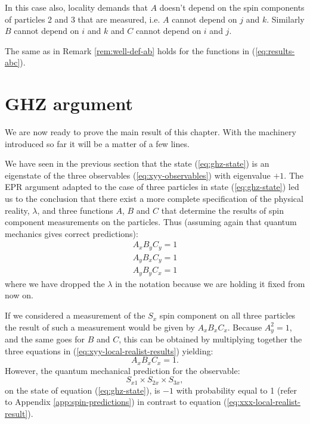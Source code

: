 In this case also, locality demands that $A$ doesn't depend on the spin components of particles 2 and 3 that are measured, i.e. $A$ cannot depend on $j$ and $k$. Similarly $B$ cannot depend on $i$ and $k$ and $C$ cannot depend on $i$ and $j$.

\begin{remark}
  \label{rem:well-def-abc}
  The same as in Remark \ref{rem:well-def-ab} holds for the functions in (\ref{eq:results-abc}).
\end{remark}


\section{GHZ argument}
We are now ready to prove the main result of this chapter. With the machinery introduced so far it will be a matter of a few lines.

We have seen in the previous section that the state (\ref{eq:ghz-state}) is an eigenstate of the three observables (\ref{eq:xyy-observables}) with eigenvalue $+ 1$. The EPR argument adapted to the case of three particles in state (\ref{eq:ghz-state}) led us to the conclusion that there exist a more complete specification of the physical reality, $\lambda$, and three functions $A$, $B$ and $C$ that determine the results of spin component measurements on the particles. Thus (assuming again that quantum mechanics gives correct predictions):%
\begin{equation}
  \begin{split}
    A_x B_y C_y = 1\\
    A_y B_x C_y = 1\\
    A_y B_y C_x = 1
  \end{split}
  \label{eq:xyy-local-realist-results}
\end{equation}
where we have dropped the $\lambda$ in the notation because we are holding it fixed from now on.

If we considered a measurement of the $S_x$ spin component on all three particles the result of such a measurement would be given by $A_x B_x C_x$. Because $A_y^2 = 1$, and the same goes for $B$ and $C$, this can be obtained by multiplying together the three equations in (\ref{eq:xyy-local-realist-results}) yielding:
\begin{equation}
  A_x B_x C_x = 1.
  \label{eq:xxx-local-realist-result}
\end{equation}
However, the quantum mechanical prediction for the observable:
\begin{equation}
  S_{x1} \times S_{2x} \times S_{3x},
  \label{eq:xxx-observable}
\end{equation}
on the state of equation (\ref{eq:ghz-state}), is $- 1$ with probability equal to 1 (refer to Appendix \ref{app:spin-predictions}) in contrast to equation (\ref{eq:xxx-local-realist-result}).

